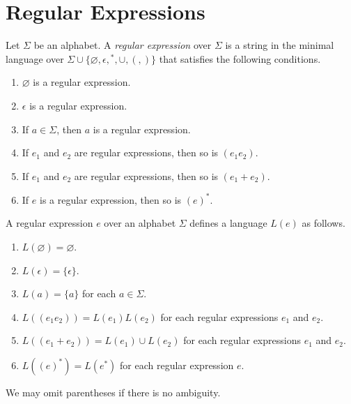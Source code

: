\section{Regular Expressions}
\begin{definition}
  Let $\Sigma$ be an alphabet.
  A \emph{regular expression} over $\Sigma$ is a string in the minimal language
  over $\Sigma \cup \{\varnothing, \epsilon, {}^*, \cup, (, )\}$
  that satisfies the following conditions.
  \begin{enumerate}[1.]
    \item $\varnothing$ is a regular expression.
    \item $\epsilon$ is a regular expression.
    \item If $a \in \Sigma$, then $a$ is a regular expression.
    \item If $e_1$ and $e_2$ are regular expressions, then so is $(e_1e_2)$.
    \item If $e_1$ and $e_2$ are regular expressions, then so is
    $(e_1 + e_2)$.
    \item If $e$ is a regular expression, then so is $(e)^*$.
  \end{enumerate}
\end{definition}

\begin{definition}
  A regular expression $e$ over an alphabet $\Sigma$ defines a language $L(e)$
  as follows.
  \begin{enumerate}[1.]
    \item $L(\varnothing) = \varnothing$.
    \item $L(\epsilon) = \{\epsilon\}$.
    \item $L(a) = \{a\}$ for each $a \in \Sigma$.
    \item $L((e_1e_2)) = L(e_1)L(e_2)$ for each regular expressions $e_1$ and
    $e_2$.
    \item $L((e_1 + e_2)) = L(e_1) \cup L(e_2)$ for each regular
    expressions $e_1$ and $e_2$.
    \item $L((e)^*) = L(e^*)$ for each regular expression $e$.
  \end{enumerate}
\end{definition}

\begin{remark}
  We may omit parentheses if there is no ambiguity.
\end{remark}

